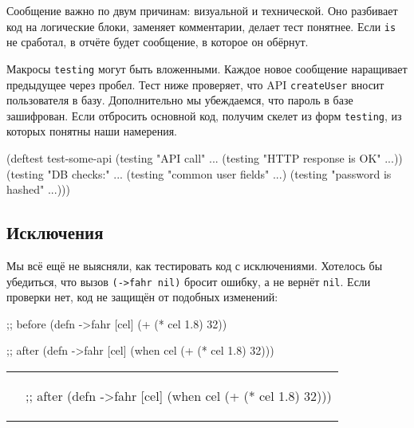 Сообщение важно по двум причинам: визуальной и технической. Оно разбивает код на
логические блоки, заменяет комментарии, делает тест понятнее. Если \verb|is|
не сработал, в отчёте будет сообщение, в которое он обёрнут.

Макросы \verb|testing| могут быть вложенными. Каждое новое сообщение наращивает
предыдущее через пробел. Тест ниже проверяет, что API \verb|createUser| вносит
пользователя в базу. Дополнительно мы убеждаемся, что пароль в базе
зашифрован. Если отбросить основной код, получим скелет из форм \verb|testing|,
из которых понятны наши намерения.

\pagebreakafive

\begin{english}
  \begin{clojure}
(deftest test-some-api
  (testing "API call" ...
    (testing "HTTP response is OK" ...))
  (testing "DB checks:" ...
    (testing "common user fields" ...)
    (testing "password is hashed" ...)))
  \end{clojure}
\end{english}

\subsection{Исключения}


Мы всё ещё не выясняли, как тестировать код с исключениями. Хотелось бы
убедиться, что вызов \verb|(->fahr nil)| бросит ошибку, а не вернёт
\verb|nil|. Если проверки нет, код не защищён от подобных изменений:

\ifnarrow

\begin{english}
  \begin{clojure}
;; before
(defn ->fahr [cel]
  (+ (* cel 1.8) 32))
  \end{clojure}

\splitter

  \begin{clojure}
;; after
(defn ->fahr [cel]
  (when cel
    (+ (* cel 1.8) 32)))
  \end{clojure}
\end{english}

\else

\begin{english}

\noindent
\iflarge
\begin{tabular}{ @{}p{5.5cm} @{}p{5cm} }
\else
\begin{tabular}{ @{}p{5cm} @{}p{5cm} }
\fi

  \begin{clojure}
;; before
(defn ->fahr [cel]
  (+ (* cel 1.8) 32))
  \end{clojure}

&

  \begin{clojure}
;; after
(defn ->fahr [cel]
  (when cel
    (+ (* cel 1.8) 32)))
  \end{clojure}

\end{tabular}

\end{english}

